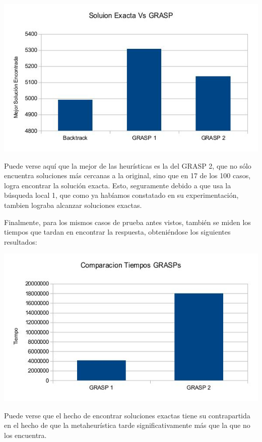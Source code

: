 \includegraphics[scale=0.5]{Ej5/graspSol.jpg}

Puede verse aquí que la mejor de las heurísticas es la del GRASP 2, que no sólo encuentra soluciones más cercanas a la original, sino que en 17 de los 100 casos, logra encontrar la solución exacta. Esto, seguramente debido a que usa la búsqueda local 1, que como ya habíamos constatado en su experimentación, tambien lograba alcanzar soluciones exactas.

Finalmente, para los mismos casos de prueba antes vistos, también se miden los tiempos que tardan en encontrar la respuesta, obteniéndose los siguientes resultados:

\includegraphics[scale=0.5]{Ej5/tiempos.jpg}

Puede verse que el hecho de encontrar soluciones exactas tiene su contrapartida en el hecho de que la metaheurística tarde significativamente más que la que no los encuentra.
